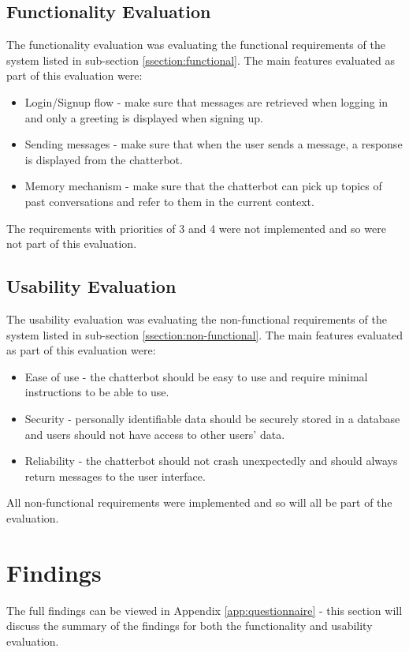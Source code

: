 \subsection{Functionality Evaluation}
The functionality evaluation was evaluating the functional requirements of the system listed in sub-section \ref{ssection:functional}. The main features evaluated as part of this evaluation were:
\begin{itemize}
	\item Login/Signup flow - make sure that messages are retrieved when logging in and only a greeting is displayed when signing up.
	\item Sending messages - make sure that when the user sends a message, a response is displayed from the chatterbot.
	\item Memory mechanism - make sure that the chatterbot can pick up topics of past conversations and refer to them in the current context. 
\end{itemize}
The requirements with priorities of 3 and 4 were not implemented and so were not part of this evaluation.
\subsection{Usability Evaluation}
The usability evaluation was evaluating the non-functional requirements of the system listed in sub-section \ref{ssection:non-functional}. The main features evaluated as part of this evaluation were:
\begin{itemize}
	\item Ease of use - the chatterbot should be easy to use and require minimal instructions to be able to use.
	\item  Security - personally identifiable data should be securely stored in a database and users should not have access to other users' data.
	\item Reliability - the chatterbot should not crash unexpectedly and should always return messages to the user interface.
\end{itemize}
All non-functional requirements were implemented and so will all be part of the evaluation.
\section{Findings}
The full findings can be viewed in Appendix \ref{app:questionnaire} - this section will discuss the summary of the findings for both the functionality and usability evaluation.
